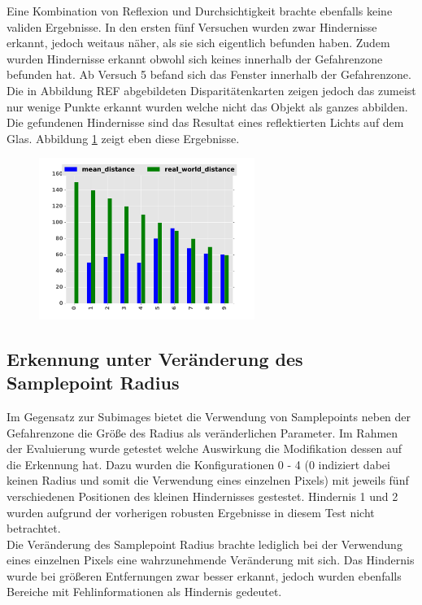 \noindent
Eine Kombination von Reflexion und Durchsichtigkeit brachte ebenfalls keine validen Ergebnisse. In den ersten fünf Versuchen wurden zwar Hindernisse erkannt, jedoch weitaus näher, als sie sich eigentlich befunden haben. Zudem wurden Hindernisse erkannt obwohl  sich keines innerhalb der Gefahrenzone befunden hat. Ab Versuch 5 befand sich das Fenster innerhalb der Gefahrenzone. Die in Abbildung REF abgebildeten Disparitätenkarten zeigen jedoch das zumeist nur wenige Punkte erkannt wurden welche nicht das Objekt als ganzes abbilden. Die gefundenen Hindernisse sind das Resultat eines reflektierten Lichts auf dem Glas. Abbildung \ref{fig:combined} zeigt eben diese Ergebnisse. 

\begin{figure}
	\centering
	\includegraphics[width=7cm]{img/reflection/combined_bar}
	\caption{}
	\label{fig:combined}
\end{figure}


\subsection{Erkennung unter Veränderung des Samplepoint Radius}
\label{subsec:test_samplepoint_radius}

Im Gegensatz zur Subimages bietet die Verwendung von Samplepoints neben der Gefahrenzone die Größe des Radius als veränderlichen Parameter. Im Rahmen der Evaluierung wurde getestet welche Auswirkung die Modifikation dessen auf die Erkennung hat. Dazu wurden die Konfigurationen 0 - 4 (0 indiziert dabei keinen Radius und somit die Verwendung eines einzelnen Pixels) mit jeweils fünf verschiedenen Positionen des kleinen Hindernisses gestestet. Hindernis 1 und 2 wurden aufgrund der vorherigen robusten Ergebnisse in diesem Test nicht betrachtet.\\

\noindent
Die Veränderung des Samplepoint Radius brachte lediglich bei der Verwendung eines einzelnen Pixels eine wahrzunehmende Veränderung mit sich. Das Hindernis wurde bei größeren Entfernungen zwar besser erkannt, jedoch wurden ebenfalls Bereiche mit Fehlinformationen als Hindernis gedeutet.

